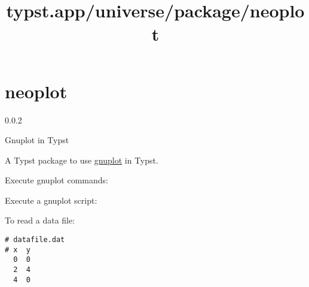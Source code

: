 \title{typst.app/universe/package/neoplot}

\label{banner}
\section{neoplot}\label{neoplot}

{ 0.0.2 }

Gnuplot in Typst

\label{readme}
A Typst package to use \href{http://www.gnuplot.info/}{gnuplot} in
Typst.

\begin{Shaded}
\begin{Highlighting}[]
\end{Highlighting}
\end{Shaded}

Execute gnuplot commands:

\begin{Shaded}
\begin{Highlighting}[]
\NormalTok{    \textasciigrave{}\textasciigrave{}\textasciigrave{}}
\NormalTok{)}
\end{Highlighting}
\end{Shaded}

Execute a gnuplot script:

\begin{Shaded}
\begin{Highlighting}[]
\NormalTok{    \textasciigrave{}\textasciigrave{}\textasciigrave{}}
\NormalTok{)}
\end{Highlighting}
\end{Shaded}

To read a data file:

\begin{verbatim}
# datafile.dat
# x  y
  0  0
  2  4
  4  0
\end{verbatim}

